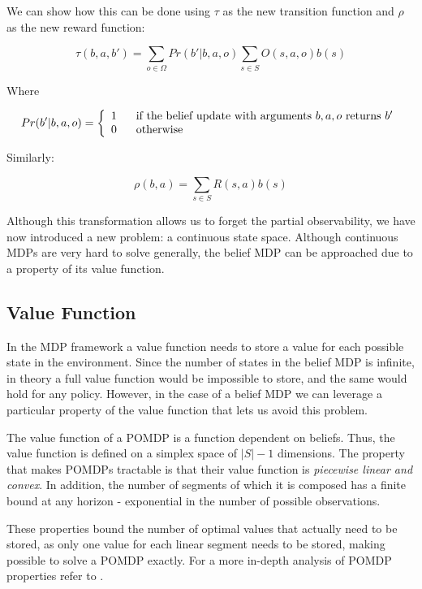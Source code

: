 We can show how this can be done using $\tau$ as the new transition function and $\rho$ as the new
reward function:

\[ \tau(b,a,b') = \sum_{o\in \Omega} Pr(b' | b, a, o) \sum_{s\in S} O(s,a,o) b(s) \]

Where

\[Pr(b' | b, a, o) = \left\{
  \begin{array}{lr}
    1 \hspace{.6cm}\text{if the belief update with arguments $b,a,o$ returns $b'$}\\
    0 \hspace{.6cm}\text{otherwise}
  \end{array}
\right.
\]

Similarly:

\[ \rho(b,a) = \sum_{s\in S} R(s,a) b(s) \]

Although this transformation allows us to forget the partial observability, we have now introduced a
new problem: a continuous state space. Although continuous MDPs are very hard to solve generally,
the belief MDP can be approached due to a property of its value function.

\subsection{Value Function}

In the MDP framework a value function needs to store a value for each possible state in the
environment. Since the number of states in the belief MDP is infinite, in theory a full value
function would be impossible to store, and the same would hold for any policy. However, in the case
of a belief MDP we can leverage a particular property of the value function that lets us avoid this
problem.

The value function of a POMDP is a function dependent on beliefs. Thus, the value function is
defined on a simplex space of $|S|-1$ dimensions. The property that makes POMDPs tractable is
that their value function is \textit{piecewise linear and convex}. In addition, the number of
segments of which it is composed has a finite bound at any horizon - exponential in the number of
possible observations.

These properties bound the number of optimal values that actually need to be stored, as only one
value for each linear segment needs to be stored, making possible to solve a POMDP exactly. For a
more in-depth analysis of POMDP properties refer to \cite{cit:pomdp}.

